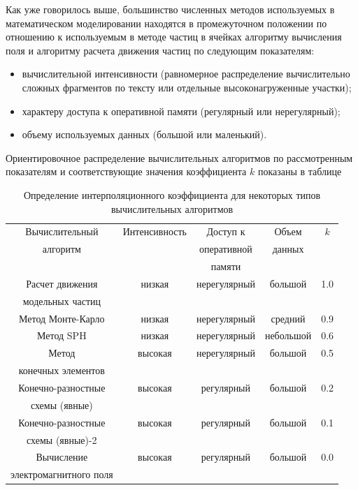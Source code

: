 Как уже говорилось выше, большинство численных методов используемых в математическом моделировании находятся в промежуточном положении по отношению к используемым в методе частиц в ячейках алгоритму вычисления поля и алгоритму расчета движения частиц по следующим показателям:
\begin{itemize}
	\item вычислительной интенсивности (равномерное распределение вычислительно сложных фрагментов по тексту или отдельные высоконагруженные участки);
	\item характеру доступа к оперативной памяти (регулярный или нерегулярный);
	\item объему используемых данных (большой или маленький).
\end{itemize}
Ориентировочное распределение вычислительных алгоритмов по рассмотренным показателям и соответствующие значения коэффициента $k$ показаны в таблице 


\begin{table}[ht]
	\begin{center}
		\caption{Определение интерполяционного коэффициента для некоторых типов вычислительных алгоритмов}
		\begin{tabular}{|c|c|c|c|c|}
			\hline
			Вычислительный    & Интенсивность &  Доступ к           & Объем  & $k$  \\ 
			алгоритм          &               &  оперативной  & данных &  \\
			&               &  памяти       &        &  \\ \hline
			Расчет движения   &  низкая       & нерегулярный        & большой & 1.0 \\ 
			модельных частиц  &               &                     &          & \\\hline
			Метод Монте-Карло &  низкая       & нерегулярный        & средний & 0.9 \\ \hline
			Метод SPH         &  низкая       & нерегулярный        & небольшой & 0.6 \\ \hline	Метод             &  высокая      & нерегулярный        & большой & 0.5  \\
			конечных элементов &          &              &         & \\ \hline
			Конечно-разностные &  высокая  & регулярный & большой & 0.2 \\ 		
			схемы (явные)      &           &            &         &     \\\hline
			Конечно-разностные &  высокая  & регулярный & большой & 0.1 \\ 		
			схемы (явные)-2    &           &            &         &     \\\hline
			Вычисление         &  высокая  & регулярный & большой & 0.0 \\ 		
			электромагнитного поля      &           &            &         &     \\\hline
			
			
		\end{tabular} 
		\label{tab-interp-koef}              
	\end{center}
\end{table}


